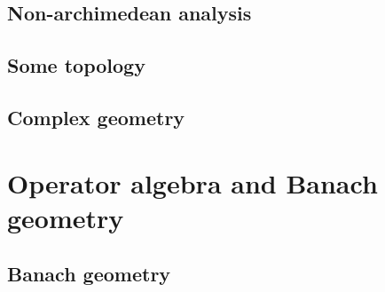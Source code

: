         \begin{appendices}
            \chapter{Non-archimedean analysis}
                \begin{abstract}
                    
                \end{abstract}
                
                \minitoc
        
            \chapter{Some topology}
                \begin{abstract}
                    
                \end{abstract}
                
                \minitoc
                
                
                
                
                
            \chapter{Complex geometry}
                \begin{abstract}
                    
                \end{abstract}
                
                \minitoc
                
                
        \end{appendices}

    \part{Operator algebra and Banach geometry}
        \chapter{Banach geometry}
            \begin{abstract}
                
            \end{abstract}
            
